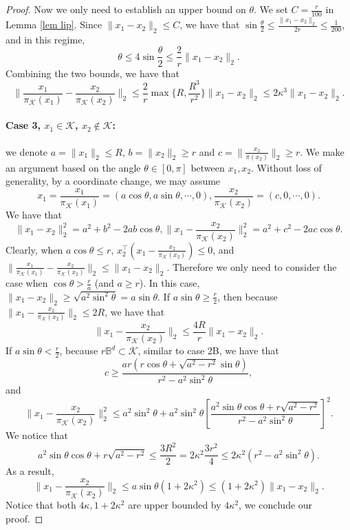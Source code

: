 \begin{proof}
Now we only need to establish an upper bound on $\theta$. We set $C=\frac{r}{100}$ in Lemma \ref{lem lip}. Since $\|x_1-x_2\|_2\le C$, we have that $\sin \frac{\theta}{2}\le \frac{\|x_1-x_2\|_2}{2r}\le \frac{1}{200}$, and in this regime, 
$$
\theta \le 4 \sin \frac{\theta}{2} \le \frac{2}{r} \|x_1-x_2\|_2.
$$
Combining the two bounds, we have that
$$
\|\frac{x_1}{\pi_{\mathcal{K}}(x_1)}-\frac{x_2}{\pi_{\mathcal{K}}(x_2)}\|_2\le \frac{2}{r}\max\{R, \frac{R^3}{r^2}\} \|x_1-x_2\|_2\le 2\kappa^3 \|x_1-x_2\|_2.
$$

\paragraph{Case 3, $x_1\in \mathcal{K}$, $x_2\notin \mathcal{K}$:} we denote $a=\|x_1\|_2\le R$, $b=\|x_2\|_2\ge r$ and $c=\|\frac{x_2}{\pi(x_2)}\|_2\ge r$. We make an argument based on the angle $\theta\in [0,\pi]$ between $x_1,x_2$. Without loss of generality, by a coordinate change, we may assume 
$$
x_1=\frac{x_1}{\pi_{\mathcal{K}}(x_1)}=(a\cos \theta,a\sin \theta,\cdots, 0),\frac{x_2}{\pi_{\mathcal{K}}(x_2)}=(c, 0, \cdots, 0).
$$
We have that
$$
\|x_1-x_2\|_2^2=a^2+b^2-2ab\cos\theta, \|x_1-\frac{x_2}{\pi_{\mathcal{K}}(x_2)}\|_2^2=a^2+c^2-2ac\cos\theta.
$$
Clearly, when $a\cos\theta\le r$, $x_2^{\top}(x_1-\frac{x_2}{\pi_{\mathcal{K}}(x_2)})\le 0$, and $\|\frac{x_1}{\pi_{\mathcal{K}}(x_1)}-\frac{x_2}{\pi_{\mathcal{K}}(x_2)}\|_2\le \|x_1-x_2\|_2$. Therefore we only need to consider the case when $\cos\theta> \frac{r}{a}$ (and $a\ge r$). In this case, $\|x_1-x_2\|_2\ge \sqrt{a^2\sin^2 \theta}=a\sin \theta$. If $a\sin \theta\ge \frac{r}{2}$, then because $\|x_1-\frac{x_2}{\pi_{\mathcal{K}}(x_2)}\|_2\le 2R$, we have that
$$
\|x_1-\frac{x_2}{\pi_{\mathcal{K}}(x_2)}\|_2\le \frac{4R}{r}\|x_1-x_2\|_2.
$$
If $a\sin \theta< \frac{r}{2}$, because $r\mathbb{B}^d\subset \mathcal{K}$, similar to case 2B, we have that 
$$
c\ge \frac{ar(r\cos\theta+\sqrt{a^2-r^2}\sin\theta)}{r^2-a^2\sin^2\theta},
$$
and
$$
\|x_1-\frac{x_2}{\pi_{\mathcal{K}}(x_2)}\|_2^2\le a^2\sin^2 \theta+a^2\sin^2 \theta[\frac{a^2\sin\theta \cos \theta+r\sqrt{a^2-r^2}}{r^2-a^2\sin^2\theta}]^2.
$$
We notice that
$$
a^2\sin\theta \cos \theta+r\sqrt{a^2-r^2}\le \frac{3R^2}{2}= 2\kappa^2 \frac{3r^2}{4}\le 2\kappa^2(r^2-a^2\sin^2\theta).
$$
As a result, 
$$
\|x_1-\frac{x_2}{\pi_{\mathcal{K}}(x_2)}\|_2\le a\sin \theta (1+2\kappa^2)\le (1+2\kappa^2)\|x_1-x_2\|_2.
$$
Notice that both $4\kappa, 1+2\kappa^2$ are upper bounded by $4\kappa^2$, we conclude our proof.
\end{proof}

